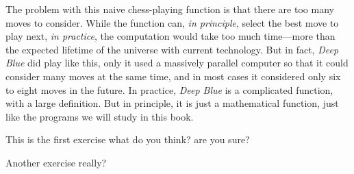 The problem with this naive chess-playing function is that there are
too many moves to consider.  While the function can, \emph{in principle},
select the best move to play next, \emph{in practice}, the computation
would take too much time---more than the expected lifetime of the
universe with current technology.  But in fact, \textit{Deep Blue}
did play like this, only it used a massively parallel computer so that
it could consider many moves at the same time, and in most cases it
considered only six to eight moves in the future.  In practice,
\textit{Deep Blue} is a complicated function, with a large
definition.  But in principle, it is just a mathematical function,
just like the programs we will study in this book. 

\begin{ExerciseList}
\Exercise This is the first exercise
        \Question what do you think?
        \Question are you sure?

\Exercise Another exercise
        \Question really?
\end{ExerciseList}      
        
